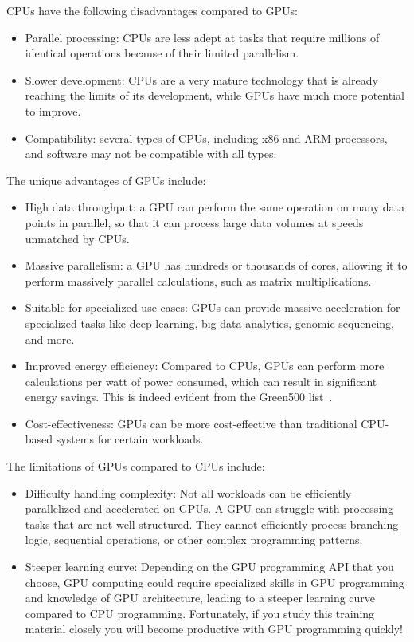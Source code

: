 CPUs have the following disadvantages compared to GPUs:
\begin{itemize}
    \item Parallel processing: CPUs are less adept at tasks that require millions of identical operations because of their limited parallelism.
    \item Slower development: CPUs are a very mature technology that is already reaching the limits of its development, while GPUs have much more potential to improve.
    \item Compatibility: several types of CPUs, including x86 and ARM processors, and software may not be compatible with all types.
\end{itemize}


The unique advantages of GPUs include:
\begin{itemize}
    \item High data throughput: a GPU can perform the same operation on many data points in parallel, so that it can process large data volumes at speeds unmatched by CPUs.
    \item Massive parallelism: a GPU has hundreds or thousands of cores, allowing it to perform massively parallel calculations, such as matrix multiplications.
    \item Suitable for specialized use cases: GPUs can provide massive acceleration for specialized tasks like deep learning, big data analytics, genomic sequencing, and more.
    \item Improved energy efficiency: Compared to CPUs, GPUs can perform more calculations per watt of power consumed, which can result in significant energy savings. This is indeed evident from the Green500 list~\cite{green500}.
    \item Cost-effectiveness: GPUs can be more cost-effective than traditional CPU-based systems for certain workloads.
\end{itemize}


The limitations of GPUs compared to CPUs include:
\begin{itemize}
    \item Difficulty handling complexity: Not all workloads can be efficiently parallelized and accelerated on GPUs. A GPU can struggle with processing tasks that are not well structured. They cannot efficiently process branching logic, sequential operations, or other complex programming patterns. %
    \item Steeper learning curve: Depending on the GPU programming API that you choose, GPU computing could require specialized skills in GPU programming and knowledge of GPU architecture, leading to a steeper learning curve compared to CPU programming. Fortunately, if you study this training material closely you will become productive with GPU programming quickly!
\end{itemize}


